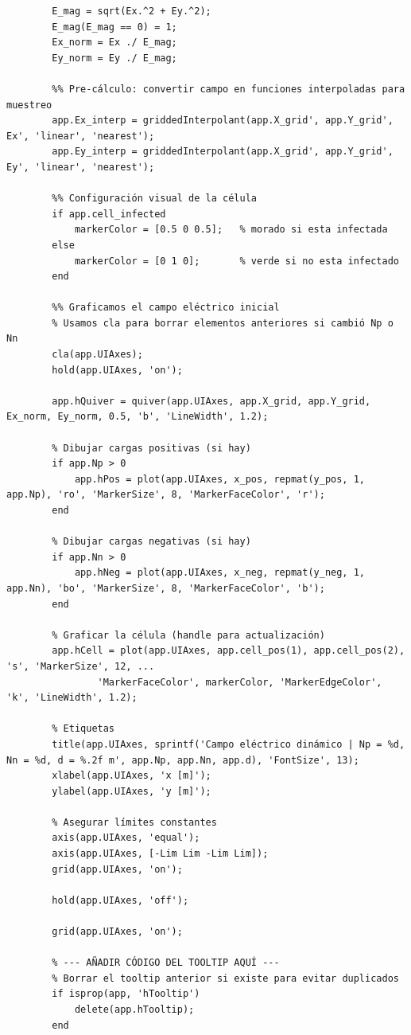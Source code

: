 \begin{lstlisting}[style=Matlab-editor]
        %% Normalización para visualización
        E_mag = sqrt(Ex.^2 + Ey.^2);
        E_mag(E_mag == 0) = 1;
        Ex_norm = Ex ./ E_mag;
        Ey_norm = Ey ./ E_mag;

        %% Pre-cálculo: convertir campo en funciones interpoladas para muestreo
        app.Ex_interp = griddedInterpolant(app.X_grid', app.Y_grid', Ex', 'linear', 'nearest');
        app.Ey_interp = griddedInterpolant(app.X_grid', app.Y_grid', Ey', 'linear', 'nearest');

        %% Configuración visual de la célula
        if app.cell_infected
            markerColor = [0.5 0 0.5];   % morado si esta infectada
        else
            markerColor = [0 1 0];       % verde si no esta infectado
        end

        %% Graficamos el campo eléctrico inicial
        % Usamos cla para borrar elementos anteriores si cambió Np o Nn
        cla(app.UIAxes);
        hold(app.UIAxes, 'on');

        app.hQuiver = quiver(app.UIAxes, app.X_grid, app.Y_grid, Ex_norm, Ey_norm, 0.5, 'b', 'LineWidth', 1.2);

        % Dibujar cargas positivas (si hay)
        if app.Np > 0
            app.hPos = plot(app.UIAxes, x_pos, repmat(y_pos, 1, app.Np), 'ro', 'MarkerSize', 8, 'MarkerFaceColor', 'r');
        end
        
        % Dibujar cargas negativas (si hay)
        if app.Nn > 0
            app.hNeg = plot(app.UIAxes, x_neg, repmat(y_neg, 1, app.Nn), 'bo', 'MarkerSize', 8, 'MarkerFaceColor', 'b');
        end

        % Graficar la célula (handle para actualización)
        app.hCell = plot(app.UIAxes, app.cell_pos(1), app.cell_pos(2), 's', 'MarkerSize', 12, ...
                'MarkerFaceColor', markerColor, 'MarkerEdgeColor', 'k', 'LineWidth', 1.2);

        % Etiquetas
        title(app.UIAxes, sprintf('Campo eléctrico dinámico | Np = %d, Nn = %d, d = %.2f m', app.Np, app.Nn, app.d), 'FontSize', 13);
        xlabel(app.UIAxes, 'x [m]'); 
        ylabel(app.UIAxes, 'y [m]');
        
        % Asegurar límites constantes
        axis(app.UIAxes, 'equal'); 
        axis(app.UIAxes, [-Lim Lim -Lim Lim]);
        grid(app.UIAxes, 'on');
        
        hold(app.UIAxes, 'off');

        grid(app.UIAxes, 'on');
        
        % --- AÑADIR CÓDIGO DEL TOOLTIP AQUÍ ---
        % Borrar el tooltip anterior si existe para evitar duplicados
        if isprop(app, 'hTooltip')
            delete(app.hTooltip);
        end
        

\end{lstlisting}
